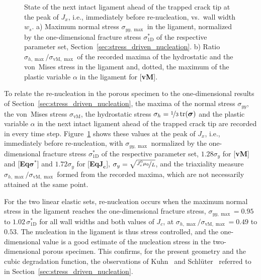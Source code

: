 \documentclass[pdflatex,sn-mathphys-num]{sn-jnl}%
\newcommand{\vMLabel}{[\textbf{vM}]\xspace}
\newcommand{\EqJcLabel}{[\textbf{Eq$\boldsymbol{J_c}$}]\xspace}
\newcommand{\EqSigmaStarLabel}{[\textbf{Eq$\boldsymbol{\sigma^*}$}]\xspace}
\theoremstyle{thmstyleone}%
\theoremstyle{thmstyletwo}%
\theoremstyle{thmstylethree}%
\begin{document}
\begin{figure}[htb]
    \centering
    \resizebox{0.9\textwidth}{!}{}%
    \caption{State of the next intact ligament ahead of the trapped crack tip at the peak of $J_x$, i.e., immediately before re-nucleation, vs.\ wall width $w_s$. a) Maximum normal stress $\sigma_{yy,\max}$ in the ligament, normalized by the one-dimensional fracture stress $\sigma^*_{\text{1D}}$ of the respective parameter set, Section~\ref{sec:stress_driven_nucleation}. b) Ratio $\sigma_{h,\max}/\sigma_{\text{vM},\max}$ of the recorded maxima of the hydrostatic and the von~Mises stress in the ligament and, dotted, the maximum of the plastic variable $\alpha$ in the ligament for \vMLabel.}
    \label{fig:ligament_state}
\end{figure}

To relate the re-nucleation in the porous specimen to the one-dimensional results of Section~\ref{sec:stress_driven_nucleation}, the maxima of the normal stress $\sigma_{yy}$, the von~Mises stress $\sigma_{\text{vM}}$, the hydrostatic stress $\sigma_h = \nicefrac{1}{3}\,\text{tr}(\boldsymbol{\sigma})$ and the plastic variable $\alpha$ in the next intact ligament ahead of the trapped crack tip are recorded in every time step. Figure~\ref{fig:ligament_state} shows these values at the peak of $J_x$, i.e., immediately before re-nucleation, with $\sigma_{yy,\max}$ normalized by the one-dimensional fracture stress $\sigma^*_{\text{1D}}$ of the respective parameter set, $1.28\sigma_y$ for \vMLabel and \EqSigmaStarLabel and $1.72\sigma_y$ for \EqJcLabel, $\sigma_y = \sqrt{\nicefrac{J_c^0\mu_0}{L}}$, and the triaxiality measure $\sigma_{h,\max}/\sigma_{\text{vM},\max}$ formed from the recorded maxima, which are not necessarily attained at the same point.

For the two linear elastic sets, re-nucleation occurs when the maximum normal stress in the ligament reaches the one-dimensional fracture stress, $\sigma_{yy,\max} = 0.95$ to $1.02\,\sigma^*_{\text{1D}}$ for all wall widths and both values of $J_c$, at $\sigma_{h,\max}/\sigma_{\text{vM},\max} = 0.49$ to $0.53$. The nucleation in the ligament is thus stress controlled, and the one-dimensional value is a good estimate of the nucleation stress in the two-dimensional porous specimen. This confirms, for the present geometry and the cubic degradation function, the observations of Kuhn~\cite{kuhn_numerical_2013} and Schl\"uter~\cite{schlueter_phase_2018} referred to in Section~\ref{sec:stress_driven_nucleation}.
\end{document}
